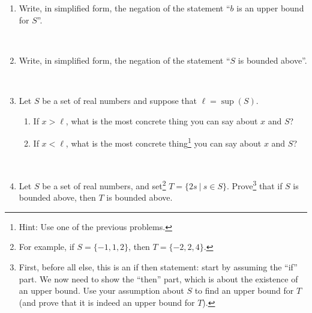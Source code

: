 \documentclass[12pt]{amsart}
\begin{document}
\begin{enumerate}
\item Write, in simplified form, the negation of the statement ``$b$ is an upper bound for $S$''.

\

\item Write, in simplified form, the negation of the statement ``$S$ is bounded above''.

\

\item Let $S$ be a set of real numbers and suppose that $\ell=\sup(S)$. 
\begin{enumerate}
\item If $x > \ell$, what is the most concrete thing you can say about $x$ and $S$?
\item If $x < \ell$, what is the most concrete thing\footnote{Hint: Use one of the previous problems.} you can say about $x$ and $S$?
\end{enumerate}

\

\item Let $S$ be a set of real numbers, and set\footnote{For example, if $S= \{-1,1,2\}$, then $T=\{-2,2,4\}$.} $T=\{ 2s \ | \ s\in S\}$. Prove\footnote{First, before all else, this is an if then statement: start by assuming the ``if'' part. We now need to show the ``then'' part, which is about the existence of an upper bound. Use your assumption about $S$ to find an upper bound for $T$ (and prove that it is indeed an upper bound for $T$).} that if $S$ is bounded above, then $T$ is bounded above.


\end{enumerate}
\end{document}
